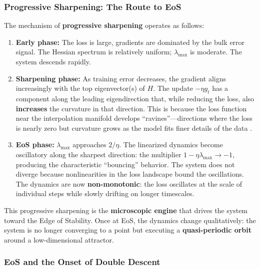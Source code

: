 \documentclass[
  journal=largetwo,
  simfonts=false,
  year=2025,
  volume=37,
]{cup-journal}
\begin{document}
\subsubsection{Progressive Sharpening: The Route to EoS}

The mechanism of \textbf{progressive sharpening} operates as follows:

\begin{enumerate}
    \item \textbf{Early phase:} The loss is large, gradients are dominated by the bulk error signal. The Hessian spectrum is relatively uniform; $\lambda_{\max}$ is moderate. The system descends rapidly.

    \item \textbf{Sharpening phase:} As training error decreases, the gradient aligns increasingly with the top eigenvector(s) of $H$. The update $-\eta g_t$ has a component along the leading eigendirection that, while reducing the loss, also \textbf{increases} the curvature in that direction. This is because the loss function near the interpolation manifold develops ``ravines''---directions where the loss is nearly zero but curvature grows as the model fits finer details of the data \cite{cohen2021gradient}.

    \item \textbf{EoS phase:} $\lambda_{\max}$ approaches $2/\eta$. The linearized dynamics become oscillatory along the sharpest direction: the multiplier $1 - \eta \lambda_{\max} \to -1$, producing the characteristic ``bouncing'' behavior. The system does not diverge because nonlinearities in the loss landscape bound the oscillations. The dynamics are now \textbf{non-monotonic}: the loss oscillates at the scale of individual steps while slowly drifting on longer timescales.
\end{enumerate}

This progressive sharpening is the \textbf{microscopic engine} that drives the system toward the Edge of Stability. Once at EoS, the dynamics change qualitatively: the system is no longer converging to a point but executing a \textbf{quasi-periodic orbit} around a low-dimensional attractor.

\subsubsection{EoS and the Onset of Double Descent}
\end{document}
